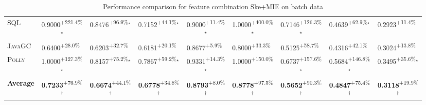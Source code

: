 \begin{table}[htbp]
\begin{tabular}{l|cccc|cccc}
\textsc{SQL} & \cellcolor{green!30}0.9000\textsuperscript{+221.4\%}$^\star$ & \cellcolor{green!30}0.8476\textsuperscript{+96.9\%}$^\star$ & \cellcolor{green!30}0.7152\textsuperscript{+44.1\%}$^\star$ & \cellcolor{green!30}0.9000\textsuperscript{+11.4\%}$^\star$ & \cellcolor{green!30}1.0000\textsuperscript{+400.0\%}$^\star$ & \cellcolor{green!30}0.7146\textsuperscript{+126.3\%}$^\star$ & \cellcolor{green!30}0.4639\textsuperscript{+62.9\%}$^\star$ & \cellcolor{green!30}0.2923\textsuperscript{+11.4\%}$^{\,\,\,}$ \\
\textsc{JavaGC} & \cellcolor{green!30}0.6400\textsuperscript{+28.0\%}$^{\,\,\,}$ & \cellcolor{green!30}0.6203\textsuperscript{+32.7\%}$^{\,\,\,}$ & \cellcolor{green!30}0.6181\textsuperscript{+20.1\%}$^{\,\,\,}$ & \cellcolor{green!30}0.8677\textsuperscript{+5.9\%}$^{\,\,\,}$ & \cellcolor{green!30}0.8000\textsuperscript{+33.3\%}$^{\,\,\,}$ & \cellcolor{green!30}0.5125\textsuperscript{+58.7\%}$^{\,\,\,}$ & \cellcolor{green!30}0.4316\textsuperscript{+42.1\%}$^{\,\,\,}$ & \cellcolor{green!30}0.3024\textsuperscript{+13.8\%}$^{\,\,\,}$ \\
\textsc{Polly} & \cellcolor{green!30}1.0000\textsuperscript{+127.3\%}$^\star$ & \cellcolor{green!30}0.8157\textsuperscript{+75.2\%}$^\star$ & \cellcolor{green!30}0.7867\textsuperscript{+59.2\%}$^\star$ & \cellcolor{green!30}0.9331\textsuperscript{+14.3\%}$^\star$ & \cellcolor{green!30}1.0000\textsuperscript{+150.0\%}$^{\,\,\,}$ & \cellcolor{green!30}0.6737\textsuperscript{+157.6\%}$^\star$ & \cellcolor{green!30}0.5684\textsuperscript{+146.8\%}$^\star$ & \cellcolor{green!30}0.3495\textsuperscript{+35.6\%}$^\star$ \\
\hline
\textbf{Average} & \cellcolor{green!30}\textbf{0.7233}\textsuperscript{+76.9\%}$^\dagger$ & \cellcolor{green!30}\textbf{0.6674}\textsuperscript{+44.1\%}$^\dagger$ & \cellcolor{green!30}\textbf{0.6778}\textsuperscript{+34.8\%}$^\dagger$ & \cellcolor{green!30}\textbf{0.8793}\textsuperscript{+8.0\%}$^\dagger$ & \cellcolor{green!30}\textbf{0.8778}\textsuperscript{+97.5\%}$^\dagger$ & \cellcolor{green!30}\textbf{0.5652}\textsuperscript{+90.3\%}$^\dagger$ & \cellcolor{green!30}\textbf{0.4847}\textsuperscript{+75.4\%}$^\dagger$ & \cellcolor{green!30}\textbf{0.3118}\textsuperscript{+19.9\%}$^\dagger$ \\
\hline
\end{tabular}
\caption{Performance comparison for feature combination Ske+MIE on batch data}
\label{tab:combo_Ske_MIE_performance_batch}
\end{table}